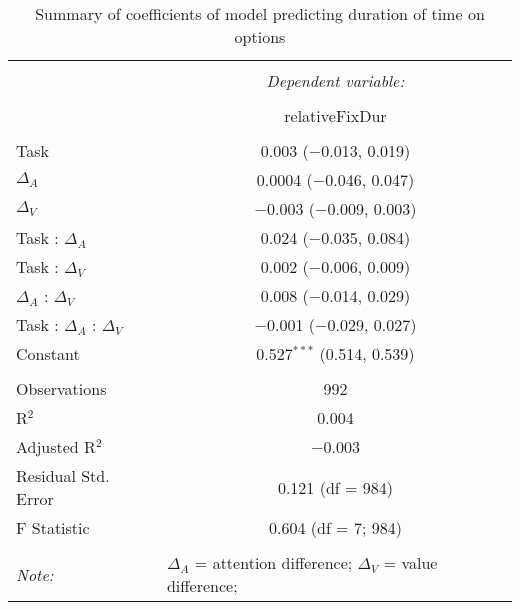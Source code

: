 
\begin{table}[!b] \centering 
  \caption{Summary of coefficients of model predicting duration of time on options} 
  \label{table:durFixModel} 
\begin{tabular}{@{\extracolsep{5pt}}lc} 
\\[-1.8ex]\hline 
\hline \\[-1.8ex] 
 & \multicolumn{1}{c}{\textit{Dependent variable:}} \\ 
\cline{2-2} 
\\[-1.8ex] & relativeFixDur \\ 
\hline \\[-1.8ex] 
 Task & 0.003 ($-$0.013, 0.019) \\ 
  $\Delta_A$ & 0.0004 ($-$0.046, 0.047) \\ 
  $\Delta_V$ & $-$0.003 ($-$0.009, 0.003) \\ 
  Task : $\Delta_A$ & 0.024 ($-$0.035, 0.084) \\ 
  Task : $\Delta_V$ & 0.002 ($-$0.006, 0.009) \\ 
  $\Delta_A$ : $\Delta_V$ & 0.008 ($-$0.014, 0.029) \\ 
  Task : $\Delta_A$ :  $\Delta_V$ & $-$0.001 ($-$0.029, 0.027) \\ 
  Constant & 0.527$^{***}$ (0.514, 0.539) \\ 
 \hline \\[-1.8ex] 
Observations & 992 \\ 
R$^{2}$ & 0.004 \\ 
Adjusted R$^{2}$ & $-$0.003 \\ 
Residual Std. Error & 0.121 (df = 984) \\ 
F Statistic & 0.604 (df = 7; 984) \\ 
\hline 
\hline \\[-1.8ex] 
\textit{Note:}  & \multicolumn{1}{l}{\footnotesize $\Delta_A$ = attention difference; $\Delta_V$ = value difference; } \\ 
\end{tabular} 
\end{table} 
